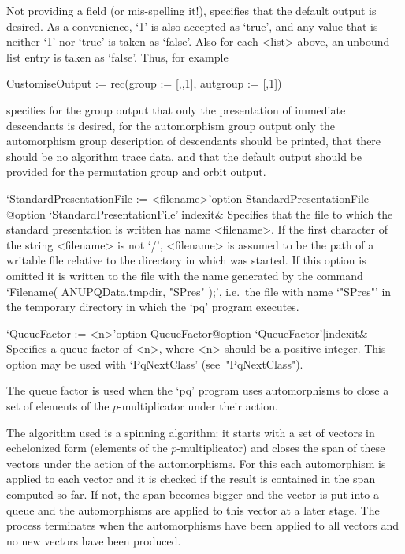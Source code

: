 Not providing a field (or mis-spelling it!), specifies that  the  default
output is desired. As a convenience, `1' is also accepted as `true',  and
any value that is neither `1' nor `true' is taken as  `false'.  Also  for
each <list> above, an unbound list entry is taken as `false'.  Thus,  for
example

\begintt
CustomiseOutput := rec(group := [,,1], autgroup := [,1])
\endtt

specifies for the group output that only the  presentation  of  immediate
descendants is desired,  for  the  automorphism  group  output  only  the
automorphism group description of descendants  should  be  printed,  that
there should be no algorithm trace data,  and  that  the  default  output
should be provided for the permutation group and orbit output.

\>`StandardPresentationFile := <filename>'{option StandardPresentationFile}%
@{option `StandardPresentationFile'|indexit}&
Specifies that the file to which the standard presentation is written has
name <filename>. If the first character of the string <filename>  is  not
`/', <filename> is assumed to be the path of a writable file relative  to
the directory in which {\GAP} was started. If this option is  omitted  it
is written to the file with the name generated by the command  `Filename(
ANUPQData.tmpdir, "SPres" );', i.e.~the file with name `"SPres"'  in  the
temporary directory in which the `pq' program executes.

\>`QueueFactor := <n>'{option QueueFactor}@{option `QueueFactor'|indexit}&
Specifies a queue factor of <n>, where <n> should be a positive  integer.
This option may be used with `PqNextClass' (see~"PqNextClass").

The queue factor is used when the `pq' program uses automorphisms to close
a set of elements of the $p$-multiplicator under their action.

The algorithm used is a spinning algorithm:  it  starts  with  a  set  of
vectors in echelonized  form  (elements  of  the  $p$-multiplicator)  and
closes the span of these vectors under the action of  the  automorphisms.
For this each automorphism is applied to each vector and it is checked if
the result is contained in the span computed so far.  If  not,  the  span
becomes bigger and the vector is put into a queue and  the  automorphisms
are applied to this vector at a later stage. The process terminates  when
the automorphisms have been applied to all vectors  and  no  new  vectors
have been produced.


